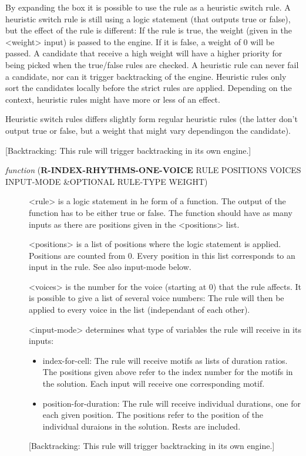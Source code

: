 \begin{description}
By expanding the box it is possible to use the rule as a heuristic switch rule. A heuristic switch rule is still using a logic statement (that outputs true or false), but the effect of the rule is different: If the rule is true, the weight (given in the <weight> input) is passed to the engine. If it is false, a weight of 0 will be passed. A candidate that receive a high weight will have a higher priority for being picked when the true/false rules are checked. A heuristic rule can never fail a candidate, nor can it trigger backtracking of the engine. Heuristic rules only sort the candidates locally before the strict rules are applied. Depending on the context, heuristic rules might have more or less of an effect. 

Heuristic switch rules differs slightly form regular heuristic rules (the latter don't output true or false, but a weight that might vary dependingon the candidate).

[Backtracking: This rule will trigger backtracking in its own engine.]
\end{description}



\begin{description}
\item[{ \emph{function} (\textbf{R-INDEX-RHYTHMS-ONE-VOICE} RULE POSITIONS VOICES INPUT-MODE \&OPTIONAL RULE-TYPE WEIGHT)}] <rule> is a logic statement in he form of a function. The output of the 
function has to be either true or false. The function should have as many 
inputs as there are positions given in the <positions> list.

<positions> is a list of positions where the logic statement is applied.
Positions are counted from 0. Every position in this list corresponds to
an input in the rule. See also input-mode below.

<voices> is the number for the voice (starting at 0) that the rule affects. 
It is possible to give a list of several voice numbers: The rule will then 
be applied to every voice in the list (independant of each other).

<input-mode> determines what type of variables the rule will receive in 
its inputs:
\begin{itemize}
\item index-for-cell: The rule will receive motifs as lists of duration 
ratios. The positions given above refer to the index
number for the motifs in the solution. Each input 
will receive one corresponding motif.
\item position-for-duration: The rule will receive individual
durations, one for each given position.
The positions refer to the position
of the individual duraions in the solution.
Rests are included.
\end{itemize}
[Backtracking: This rule will trigger backtracking in its own engine.]
\end{description}


